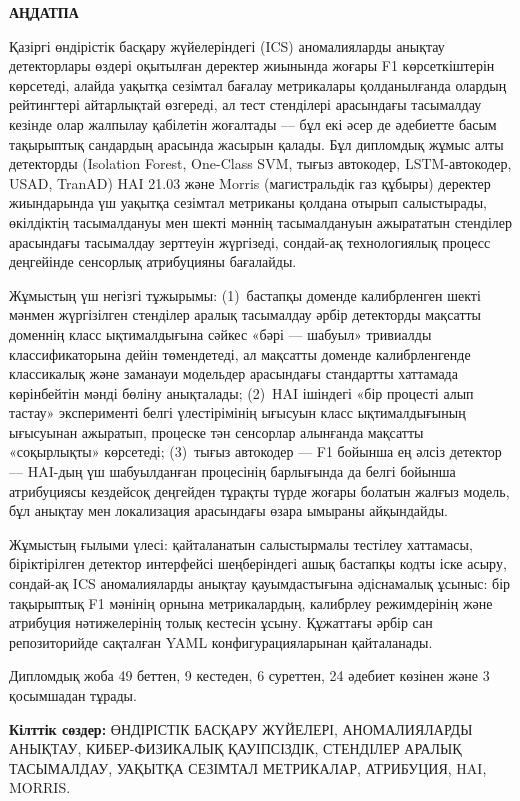 
\begin{kazakh}
\thispagestyle{empty}
\begin{center}
{\Large \textbf{АҢДАТПА}\par}
\end{center}
\vspace{0.5cm}

Қазіргі өндірістік басқару жүйелеріндегі (ICS) аномалияларды анықтау детекторлары өздері оқытылған деректер жиынында жоғары F1 көрсеткіштерін көрсетеді, алайда уақытқа сезімтал бағалау метрикалары қолданылғанда олардың рейтингтері айтарлықтай өзгереді, ал тест стенділері арасындағы тасымалдау кезінде олар жалпылау қабілетін жоғалтады --- бұл екі әсер де әдебиетте басым тақырыптық сандардың арасында жасырын қалады.  Бұл дипломдық жұмыс алты детекторды (Isolation Forest, One-Class SVM, тығыз автокодер, LSTM-автокодер, USAD, TranAD) HAI 21.03 және Morris (магистральдік газ құбыры) деректер жиындарында үш уақытқа сезімтал метриканы қолдана отырып салыстырады, өкілдіктің тасымалдануы мен шекті мәннің тасымалдануын ажырататын стенділер арасындағы тасымалдау зерттеуін жүргізеді, сондай-ақ технологиялық процесс деңгейінде сенсорлық атрибуцияны бағалайды.

Жұмыстың үш негізгі тұжырымы: (1)~бастапқы доменде калибрленген шекті мәнмен жүргізілген стенділер аралық тасымалдау әрбір детекторды мақсатты доменнің класс ықтималдығына сәйкес «бәрі --- шабуыл» тривиалды классификаторына дейін төмендетеді, ал мақсатты доменде калибрленгенде классикалық және заманауи модельдер арасындағы стандартты хаттамада көрінбейтін мәнді бөліну анықталады; (2)~HAI ішіндегі «бір процесті алып тастау» эксперименті белгі үлестірімінің ығысуын класс ықтималдығының ығысуынан ажыратып, процеске тән сенсорлар алынғанда мақсатты «соқырлықты» көрсетеді; (3)~тығыз автокодер --- F1 бойынша ең әлсіз детектор --- HAI-дың үш шабуылданған процесінің барлығында да белгі бойынша атрибуциясы кездейсоқ деңгейден тұрақты түрде жоғары болатын жалғыз модель, бұл анықтау мен локализация арасындағы өзара ымыраны айқындайды.

Жұмыстың ғылыми үлесі: қайталанатын салыстырмалы тестілеу хаттамасы, біріктірілген детектор интерфейсі шеңберіндегі ашық бастапқы кодты іске асыру, сондай-ақ ICS аномалияларды анықтау қауымдастығына әдіснамалық ұсыныс: бір тақырыптық F1 мәнінің орнына метрикалардың, калибрлеу режимдерінің және атрибуция нәтижелерінің толық кестесін ұсыну.  Құжаттағы әрбір сан репозиторийде сақталған YAML конфигурацияларынан қайталанады.

\vspace{0.3cm}

Дипломдық жоба 49 беттен, 9 кестеден, 6 суреттен, 24 әдебиет көзінен және 3 қосымшадан тұрады.

\vspace{0.3cm}
\noindent\textbf{Кілттік сөздер:} ӨНДІРІСТІК БАСҚАРУ ЖҮЙЕЛЕРІ, АНОМАЛИЯЛАРДЫ АНЫҚТАУ, КИБЕР-ФИЗИКАЛЫҚ ҚАУІПСІЗДІК, СТЕНДІЛЕР АРАЛЫҚ ТАСЫМАЛДАУ, УАҚЫТҚА СЕЗІМТАЛ МЕТРИКАЛАР, АТРИБУЦИЯ, HAI, MORRIS.
\end{kazakh}
\newpage
